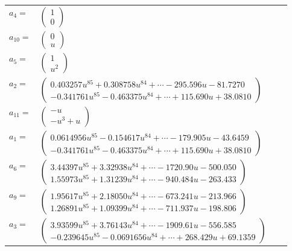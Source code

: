 \documentclass[1p]{elsarticle_modified}
\theoremstyle{definition}
\begin{document}
\begin{tabular}{m{7pt} m{180pt} m{7pt} m{180pt} }
\flushright $a_{4}=$&$\begin{pmatrix}1\\0\end{pmatrix}$ \\
\flushright $a_{10}=$&$\begin{pmatrix}0\\u\end{pmatrix}$ \\
\flushright $a_{5}=$&$\begin{pmatrix}1\\u^2\end{pmatrix}$ \\
\flushright $a_{2}=$&$\begin{pmatrix}0.403257 u^{85}+0.308758 u^{84}+\cdots-295.596 u-81.7270\\-0.341761 u^{85}-0.463375 u^{84}+\cdots+115.690 u+38.0810\end{pmatrix}$ \\
\flushright $a_{11}=$&$\begin{pmatrix}- u\\- u^3+u\end{pmatrix}$ \\
\flushright $a_{1}=$&$\begin{pmatrix}0.0614956 u^{85}-0.154617 u^{84}+\cdots-179.905 u-43.6459\\-0.341761 u^{85}-0.463375 u^{84}+\cdots+115.690 u+38.0810\end{pmatrix}$ \\
\flushright $a_{6}=$&$\begin{pmatrix}3.44397 u^{85}+3.32938 u^{84}+\cdots-1720.90 u-500.050\\1.55973 u^{85}+1.31239 u^{84}+\cdots-940.484 u-263.433\end{pmatrix}$ \\
\flushright $a_{9}=$&$\begin{pmatrix}1.95617 u^{85}+2.18050 u^{84}+\cdots-673.241 u-213.966\\1.26891 u^{85}+1.09399 u^{84}+\cdots-711.937 u-198.806\end{pmatrix}$ \\
\flushright $a_{3}=$&$\begin{pmatrix}3.93599 u^{85}+3.76143 u^{84}+\cdots-1909.61 u-556.585\\-0.239645 u^{85}-0.0691656 u^{84}+\cdots+268.429 u+69.1359\end{pmatrix}$ \\

\end{tabular}
\end{document}
